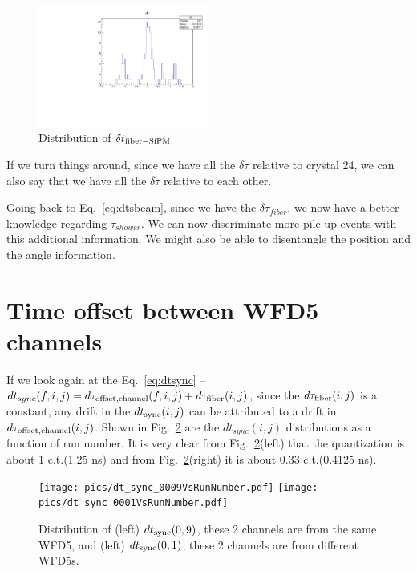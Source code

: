 \begin{figure}[htbp]
\centering
\includegraphics[width=0.5\textwidth]{pics/grid.pdf} 
\caption{Distribution of $\delta t_{\rm{fiber-SiPM}}$}\label{fig:grid}
\end{figure}

If we turn things around, since we have all the $\delta \tau$ relative to crystal 24, we can also say that we have all the $\delta \tau$
relative to each other.

Going back to Eq.~\ref{eq:dtsbeam}, since we have the $\delta \tau_{fiber}$, we now have a better knowledge 
regarding $\tau_{shower}$. We can now discriminate more pile up events with this additional information.
We might also be able to disentangle the position and the angle information.


\section{Time offset between WFD5 channels}

If we look again at the Eq.~\ref{eq:dtsync} -- $dt_{sync}(f,i,j) = d\tau_{\rm{offset,channel}}(f,i,j) + d\tau_{\rm{fiber}}(i,j)$, since the $d\tau_{\rm{fiber}}(i,j)$ is a constant, any drift in the $dt_{\rm{sync}}(i,j)$ can be attributed to a drift in $d\tau_{\rm{offset,channel}}(i,j)$. Shown in Fig.~\ref{fig:dtsyncDist} are the $dt_{sync}(i,j)$ distributions as a function of run number.
It is very clear from Fig.~\ref{fig:dtsyncDist}(left) that the quantization is about 1 c.t.(1.25 ns) and from Fig.~\ref{fig:dtsyncDist}(right) it is about 0.33 c.t.(0.4125 ns).

\begin{figure}[htbp]
\centering
\texttt{[image: pics/dt\_sync\_0009VsRunNumber.pdf]} 
\texttt{[image: pics/dt\_sync\_0001VsRunNumber.pdf]} 
\caption{Distribution of (left) $dt_{\rm{sync}}(0,9)$, these 2 channels are from the same WFD5, and (left) $dt_{\rm{sync}}(0,1)$, these 2 channels are from different  WFD5s.}\label{fig:dtsyncDist}
\end{figure}




